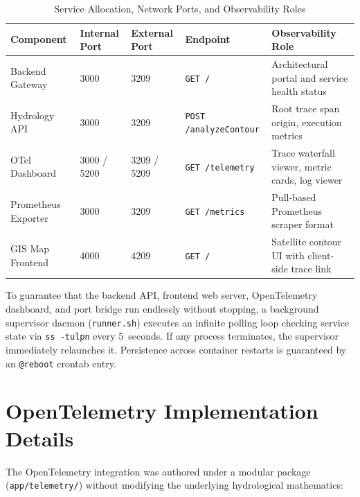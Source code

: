 \documentclass[manuscript,screen]{acmart}
\begin{document}
\begin{table}[h]
  \caption{Service Allocation, Network Ports, and Observability Roles}
  \label{tab:ports}
  \begin{tabular}{lllll}
    \toprule
    Component & Internal Port & External Port & Endpoint & Observability Role \\
    \midrule
    Backend Gateway & 3000 & 3209 & \texttt{GET /} & Architectural portal and service health status \\
    Hydrology API & 3000 & 3209 & \texttt{POST /analyzeContour} & Root trace span origin, execution metrics \\
    OTel Dashboard & 3000 / 5200 & 3209 / 5209 & \texttt{GET /telemetry} & Trace waterfall viewer, metric cards, log viewer \\
    Prometheus Exporter & 3000 & 3209 & \texttt{GET /metrics} & Pull-based Prometheus scraper format \\
    GIS Map Frontend & 4000 & 4209 & \texttt{GET /} & Satellite contour UI with client-side trace link \\
    \bottomrule
  \end{tabular}
\end{table}

To guarantee that the backend API, frontend web server, OpenTelemetry dashboard, and port bridge run endlessly without stopping, a background supervisor daemon (\texttt{runner.sh}) executes an infinite polling loop checking service state via \texttt{ss -tulpn} every 5~seconds. If any process terminates, the supervisor immediately relaunches it. Persistence across container restarts is guaranteed by an \texttt{@reboot} crontab entry.

\section{OpenTelemetry Implementation Details}
\label{sec:implementation}

The OpenTelemetry integration was authored under a modular package (\texttt{app/telemetry/}) without modifying the underlying hydrological mathematics:
\end{document}
